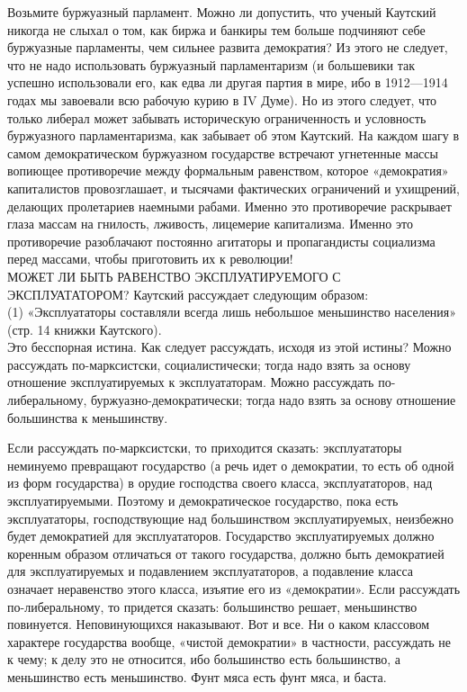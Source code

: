 \documentclass[12pt]{article}
\newcommand{\parnum}{(\arabic{parcount})}
\newcounter{parcount}
\newenvironment{parnumbers}{%
  \par%
  \everypar{\noindent \stepcounter{parcount}\marginpar[]{\parnum}}%
}{}
\begin{document}
\begin{parnumbers}
Возьмите буржуазный парламент. Можно ли допустить, что ученый Каутский никогда не слыхал о том, как биржа и банкиры тем больше подчиняют себе буржуазные парламенты, чем сильнее развита демократия? Из этого не следует, что не надо использовать буржуазный парламентаризм (и большевики так успешно использовали его, как едва ли другая партия в мире, ибо в 1912—1914 годах мы завоевали всю рабочую курию в IV Думе). Но из этого следует, что только либерал может забывать историческую ограниченность и условность буржуазного парламентаризма, как забывает об этом Каутский. На каждом шагу в самом демократическом буржуазном государстве встречают угнетенные массы вопиющее противоречие между формальным равенством, которое «демократия» капиталистов провозглашает, и тысячами фактических ограничений и ухищрений, делающих пролетариев наемными рабами. Именно это противоречие раскрывает глаза массам на гнилость, лживость, лицемерие капитализма. Именно это противоречие разоблачают постоянно агитаторы и пропагандисты социализма перед массами, чтобы приготовить их к революции! \\
МОЖЕТ ЛИ БЫТЬ РАВЕНСТВО ЭКСПЛУАТИРУЕМОГО С ЭКСПЛУАТАТОРОМ? Каутский рассуждает следующим образом: \\
(1) «Эксплуататоры составляли всегда лишь небольшое меньшинство населения» (стр. 14 книжки Каутского). \\
Это бесспорная истина. Как следует рассуждать, исходя из этой истины? Можно рассуждать по-марксистски, социалистически; тогда надо взять за основу отношение эксплуатируемых к эксплуататорам. Можно рассуждать по-либеральному, буржуазно-демократически; тогда надо взять за основу отношение большинства к меньшинству.

Если рассуждать по-марксистски, то приходится сказать: эксплуататоры неминуемо превращают государство (а речь идет о демократии, то есть об одной из форм государства) в орудие господства своего класса, эксплуататоров, над эксплуатируемыми. Поэтому и демократическое государство, пока есть эксплуататоры, господствующие над большинством эксплуатируемых, неизбежно будет демократией для эксплуататоров. Государство эксплуатируемых должно коренным образом отличаться от такого государства, должно быть демократией для эксплуатируемых и подавлением эксплуататоров, а подавление класса означает неравенство этого класса, изъятие его из «демократии». Если рассуждать по-либеральному, то придется сказать: большинство решает, меньшинство повинуется. Неповинующихся наказывают. Вот и все. Ни о каком классовом характере государства вообще, «чистой демократии» в частности, рассуждать не к чему; к делу это не относится, ибо большинство есть большинство, а меньшинство есть меньшинство. Фунт мяса есть фунт мяса, и баста.


\end{parnumbers}
\end{document}
